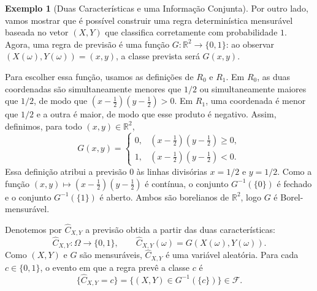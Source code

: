 \documentclass[12pt,portuguese]{article}
\theoremstyle{definition}
\newtheorem{example}[example]{Exemplo}
\theoremstyle{plainexercise}
\theoremstyle{starredexercise}
\theoremstyle{definition}
\begin{document}
\begin{example}[Duas Características e uma Informação Conjunta]
\bigskip 

Por outro lado, vamos mostrar que é possível construir uma regra determinística
mensurável baseada no vetor $(X,Y)$ que classifica corretamente com
probabilidade $1$. Agora, uma regra de previsão é uma função
$G:\mathbb{R}^2\to\{0,1\}$: ao observar
$(X(\omega),Y(\omega))=(x,y)$, a classe prevista será $G(x,y)$.

Para escolher essa função, usamos as definições de $R_0$ e $R_1$. Em $R_0$,
as duas coordenadas são simultaneamente menores que $1/2$ ou simultaneamente
maiores que $1/2$, de modo que $(x-\tfrac12)(y-\tfrac12)>0$. Em $R_1$,
uma coordenada é menor que $1/2$ e a outra é maior, de modo que esse produto
é negativo. Assim, definimos, para todo $(x,y)\in\mathbb{R}^2$,
\[
  G(x,y)=
  \begin{cases}
    0, & (x-\tfrac12)(y-\tfrac12)\geqslant 0,\\[0.2cm]
    1, & (x-\tfrac12)(y-\tfrac12)<0.
  \end{cases}
\]
Essa definição atribui a previsão $0$ às linhas divisórias $x=1/2$ e
$y=1/2$. Como a função $(x,y)\mapsto(x-\tfrac12)(y-\tfrac12)$ é contínua,
o conjunto $G^{-1}(\{0\})$ é fechado e o conjunto $G^{-1}(\{1\})$ é aberto.
Ambos são borelianos de $\mathbb{R}^2$, logo $G$ é Borel-mensurável.

Denotemos por $\widehat{C}_{X,Y}$ a previsão obtida a partir das duas
características:
\[
  \widehat{C}_{X,Y}:\Omega\to\{0,1\},
  \qquad \widehat{C}_{X,Y}(\omega)=G(X(\omega),Y(\omega)).
\]
Como $(X,Y)$ e $G$ são mensuráveis, $\widehat{C}_{X,Y}$ é uma variável
aleatória. Para cada $c\in\{0,1\}$, o evento em que a regra prevê a classe
$c$ é
\[
  \{\widehat{C}_{X,Y}=c\}
  =\{(X,Y)\in G^{-1}(\{c\})\}\in\mathcal{F}.
\]


\end{example}
\end{document}
